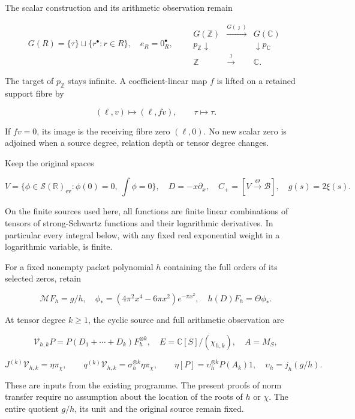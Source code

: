 The scalar construction and its arithmetic observation remain

\[
G(R)=\{\tau\}\sqcup\{r^\bullet:r\in R\},\quad e_R=0_R^\bullet,
\qquad
\begin{array}{ccc}
G(\mathbb Z)&\xrightarrow{G(\jmath)}&G(\mathbb C)\\
p_{\mathbb Z}\downarrow&&\downarrow p_{\mathbb C}\\
\mathbb Z&\xrightarrow{\jmath}&\mathbb C.
\end{array} \tag{P5}
\]

The target of \(p_{\mathbb Z}\) stays infinite. A coefficient-linear map \(f\) is lifted on a retained support fibre by

\[
(\ell,v)\longmapsto(\ell,fv),\qquad \tau\longmapsto\tau. \tag{P6}
\]

If \(fv=0\), its image is the receiving fibre zero \((\ell,0)\). No new scalar zero is adjoined when a source degree, relation depth or tensor degree changes.

Keep the original spaces

\[
V=\{\phi\in\mathcal S(\mathbb R)_{\mathrm{ev}}:
\phi(0)=0,\ \int\phi=0\},\quad
D=-x\partial_x,\quad C_+=[V\xrightarrow\Theta\mathscr B],
\quad g(s)=2\xi(s). \tag{P7}
\]

On the finite sources used here, all functions are finite linear combinations of tensors of strong-Schwartz functions and their logarithmic derivatives. In particular every integral below, with any fixed real exponential weight in a logarithmic variable, is finite.

For a fixed nonempty packet polynomial \(h\) containing the full orders of its selected zeros, retain

\[
\mathcal MF_h=g/h,\quad
\phi_*=(4\pi^2x^4-6\pi x^2)e^{-\pi x^2},\quad
h(D)F_h=\Theta\phi_* . \tag{P8}
\]

At tensor degree \(k\ge1\), the cyclic source and full arithmetic observation are

\[
\mathcal V_{h,k}P=P(D_1+\cdots+D_k)F_h^{\otimes k},
\quad E=\mathbb C[S]/(\chi_{h,k}),\quad A=M_S,
\tag{P9}
\]

\[
J^{(k)}\mathcal V_{h,k}=\eta\pi_\chi,
\qquad q^{(k)}\mathcal V_{h,k}
=\sigma_h^{\otimes k}\eta\pi_\chi,
\qquad
\eta[P]=\upsilon_h^{\otimes k}P(A_k)1,
\quad\upsilon_h=j_h(g/h). \tag{P10}
\]

These are inputs from the existing programme. The present proofs of norm transfer require no assumption about the location of the roots of \(h\) or \(\chi\). The entire quotient \(g/h\), its unit and the original source remain fixed.

